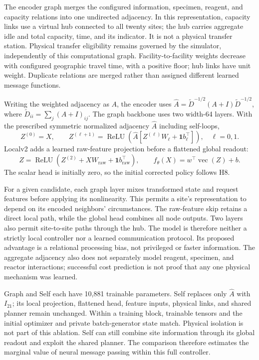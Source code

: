 \documentclass[preprint,12pt]{elsarticle}
\newcommand{\vecop}{\operatorname{vec}}
\newcommand{\relu}{\operatorname{ReLU}}
\begin{document}
The encoder graph merges the configured information, specimen, reagent, and
capacity relations into one undirected adjacency. In this representation,
capacity links use a virtual hub connected to all twenty sites; the hub carries
aggregate idle and total capacity, time, and its indicator. It is not a physical
transfer station. Physical transfer eligibility remains governed by the
simulator, independently of this computational graph. Facility-to-facility
weights decrease with configured geographic travel time, with a positive floor;
hub links have unit weight. Duplicate relations are merged rather than assigned
different learned message functions.

Writing the weighted adjacency as $A$, the encoder uses
$\widehat A=\widetilde D^{-1/2}(A+I)\widetilde D^{-1/2}$, where
$\widetilde D_{ii}=\sum_j(A+I)_{ij}$.
The graph backbone uses two width-64 layers. With the prescribed symmetric
normalized adjacency $\widehat A$ including self-loops,
\begin{equation}
 Z^{(0)}=X,\qquad
 Z^{(\ell+1)}=\relu\!\left(
 \widehat A[Z^{(\ell)}W_\ell+\mathbf1 b_\ell^\top]\right),
 \quad \ell=0,1.
 \label{eq:gcn}
\end{equation}
Localv2 adds a learned raw-feature projection before a flattened global readout:
\begin{equation}
 Z=\relu\!\left(Z^{(2)}+XW_{\mathrm{raw}}+
                    \mathbf1 b_{\mathrm{raw}}^\top\right),\qquad
 f_\theta(X)=w^\top\vecop(Z)+b.
 \label{eq:localv2}
\end{equation}
The scalar head is initially zero, so the initial corrected policy follows H8.

For a given candidate, each graph layer mixes transformed state and request
features before applying its nonlinearity. This permits a site's representation
to depend on its encoded neighbors' circumstances. The raw-feature skip retains
a direct local path, while the global head combines all node outputs. Two layers
also permit site-to-site paths through the hub. The model is therefore neither
a strictly local controller nor a learned communication protocol. Its proposed
advantage is a relational processing bias, not privileged or faster information.
The aggregate adjacency also does not separately model reagent, specimen, and
reactor interactions; successful cost prediction is not proof that any one
physical mechanism was learned.

Graph and Self each have 10,881 trainable parameters. Self replaces only
$\widehat A$ with $I_{21}$; its local projection, flattened head, feature inputs,
physical links, and shared planner remain unchanged. Within a training block,
trainable tensors and the initial optimizer and private batch-generator state
match. Physical isolation is not part of this ablation. Self can still combine
site information through its global readout and exploit the shared planner.
The comparison therefore estimates the marginal value of neural message passing
within this full controller.
\end{document}
